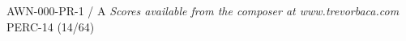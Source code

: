 \documentclass[11pt]{report}
\begin{document}
\null \vfill

AWN-000-PR-1 / A \hfill
\textit{Scores available from the composer at www.trevorbaca.com}
\hfill PERC-14 (14/64)
\end{document}
